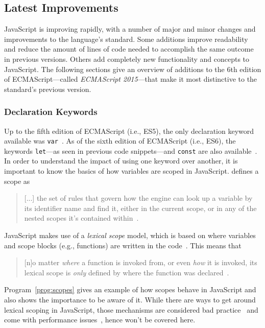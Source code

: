 \subsection{Latest Improvements}
JavaScript is improving rapidly, with a number of major and minor changes and improvements to the language's standard. Some additions improve readability and reduce the amount of lines of code needed to accomplish the same outcome in previous versions. Others add completely new functionality and concepts to JavaScript. The following sections give an overview of additions to the 6th edition of ECMAScript---called \emph{ECMAScript 2015}---that make it most distinctive to the standard's previous version.

\label{sec:latest-improvements}

\subsubsection{Declaration Keywords}

Up to the fifth edition of ECMAScript (i.e., ES5), the only declaration keyword available was \texttt{var}~\cite[p.~87]{ES5Spec:Ecma:2015}. As of the sixth edition of ECMAScript (i.e., ES6), the keywords \texttt{let}---as seen in previous code snippets---and \texttt{const} are also available~\cite[p.~194]{ES6Spec:Ecma:2015}. In order to understand the impact of using one keyword over another, it is important to know the basics of how variables are scoped in JavaScript. \citeauthor{YDKJS:ScopesAndClosures:Simpson:2014} defines a scope as 
\begin{quote}
  [...] the set of rules that govern how the engine can look up a variable by its identifier name and find it, either in the current scope, or in any of the nested scopes it’s contained within~\cite[p.~13]{YDKJS:ScopesAndClosures:Simpson:2014}.
\end{quote}
JavaScript makes use of a \emph{lexical scope} model, which is based on where variables and scope blocks (e.g., functions) are written in the code~\cite[p.~13]{YDKJS:ScopesAndClosures:Simpson:2014}. This means that 
\begin{quote}
  [n]o matter \emph{where} a function is invoked from, or even \emph{how} it is invoked, its lexical scope is \emph{only} defined by where the function was declared~\cite[p.~16]{YDKJS:ScopesAndClosures:Simpson:2014}.
\end{quote}
Program~\ref{prog:scopes} gives an example of how scopes behave in JavaScript and also shows the importance to be aware of it. While there are ways to get around lexical scoping in JavaScript, those mechanisms are considered bad practice~\cite[p.~14]{YDKJS:ScopesAndClosures:Simpson:2014} and come with performance issues~\cite[p.~21]{YDKJS:ScopesAndClosures:Simpson:2014}, hence won't be covered here.


